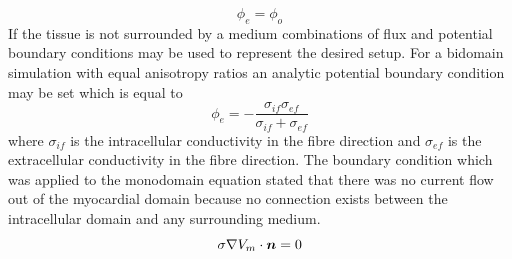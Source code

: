 \begin{equation}
  \phi_e = \phi_o
\end{equation}
If the tissue is not
surrounded by a medium combinations of flux and potential boundary conditions
may be used to represent the desired setup. For a bidomain simulation with
equal anisotropy ratios an analytic potential boundary condition 
may be set which is equal to
\begin{equation}
  \phi_e=-\dfrac{\sigma_{if}\sigma_{ef}}{\sigma_{if}+\sigma_{ef}}
\end{equation}
where $\sigma_{if}$ is the intracellular conductivity in the fibre direction
and $\sigma_{ef}$ is the extracellular conductivity in the fibre direction.
The boundary condition which was applied to the monodomain equation stated
that there was no current flow out of the myocardial domain because no
connection exists between the intracellular domain and any surrounding medium.
\begin{equation}
  \dotprod{\sigma \grad V_m}{\vect{n}}=0
\end{equation}

